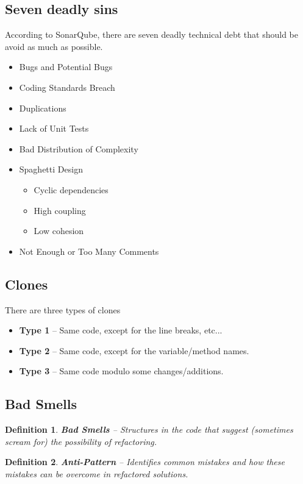 \documentclass[a4paper,11pt]{report}
\newtheorem{definition}{Definition}
\begin{document}
	\subsection{Seven deadly sins}\noindent
		According to SonarQube, there are seven
			deadly technical debt that should be 
			avoid as much as possible.	
		\begin{itemize}
			\setlength{\itemsep}{0pt}		
			\setlength{\parskip}{0pt}		
			\setlength{\parsep}{0pt}	
			\item Bugs and Potential Bugs
			\item Coding Standards Breach
			\item Duplications
			\item Lack of Unit Tests
			\item Bad Distribution of Complexity
			\item Spaghetti Design
				\begin{itemize}	
					\setlength{\itemsep}{0pt}		
					\setlength{\parskip}{0pt}		
					\setlength{\parsep}{0pt}	
					\item Cyclic dependencies
					\item High coupling
					\item Low cohesion
				\end{itemize}
			\item Not Enough or Too Many Comments
		\end{itemize}
	\subsection{Clones}\noindent
		There are three types of clones
		\begin{itemize}
			\setlength{\itemsep}{0pt}		
			\setlength{\parskip}{0pt}		
			\setlength{\parsep}{0pt}	
			\item \textbf{Type 1} -- Same code,
				except for the line breaks, etc...
			\item \textbf{Type 2} -- Same code,
				except for the variable/method
				names.
			\item \textbf{Type 3} -- Same code 
				modulo some changes/additions.
		\end{itemize}
	\subsection{Bad Smells}
		\begin{definition}
			\textbf{Bad Smells} -- 
				Structures in the code that suggest
				(sometimes scream for) the
				possibility of refactoring.
		\end{definition}
		\begin{definition}
			\textbf{Anti-Pattern} -- 
				Identifies common mistakes and how 
				these mistakes
				can be overcome in refactored solutions.
		\end{definition}\noindent
		
\end{document}
